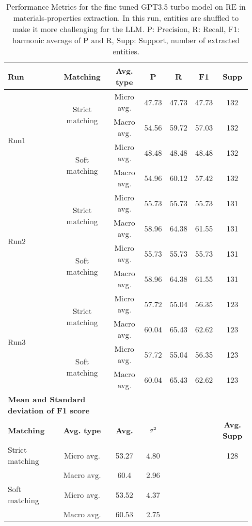 \begin{table}[htbp]
    \small
    \centering
    \caption{Performance Metrics for the fine-tuned GPT3.5-turbo model on RE in materials-properties extraction. In this run, entities are shuffled to make it more challenging for the LLM. P: Precision, R: Recall, F1: harmonic average of P and R, Supp: Support, number of extracted entities.}
    \begin{tabular}{lcccccc}
        \toprule
        \textbf{Run} & \textbf{Matching} & \textbf{Avg. type} & \textbf{P} & \textbf{R} & \textbf{F1} & \textbf{Supp} \\
        \midrule
        \multirow{4}{*}{Run1} & \multirow{2}{*}{Strict matching} & Micro avg. & 47.73 & 47.73 & 47.73 & 132 \\
        & & Macro avg. & 54.56 & 59.72 & 57.03 & 132 \\
        \cmidrule{2-7}
        & \multirow{2}{*}{Soft matching} & Micro avg. & 48.48 & 48.48 & 48.48 & 132 \\
        & & Macro avg. & 54.96 & 60.12 & 57.42 & 132 \\
        \midrule
        \multirow{4}{*}{Run2} & \multirow{2}{*}{Strict matching} & Micro avg. & 55.73 & 55.73 & 55.73 & 131 \\
        & & Macro avg. & 58.96 & 64.38 & 61.55 & 131 \\
        \cmidrule{2-7}
        & \multirow{2}{*}{Soft matching} & Micro avg. & 55.73 & 55.73 & 55.73 & 131 \\
        & & Macro avg. & 58.96 & 64.38 & 61.55 & 131 \\
        \midrule
        \multirow{4}{*}{Run3} & \multirow{2}{*}{Strict matching} & Micro avg. & 57.72 & 55.04 & 56.35 & 123 \\
        & & Macro avg. & 60.04 & 65.43 & 62.62 & 123 \\
        \cmidrule{2-7}
        & \multirow{2}{*}{Soft matching} & Micro avg. & 57.72 & 55.04 & 56.35 & 123 \\
        & & Macro avg. & 60.04 & 65.43 & 62.62 & 123 \\
        \midrule
        \multicolumn{2}{l}{\textbf{Mean and Standard deviation of F1 score}} & & & & & \\
        \midrule
        \textbf{Matching} & \textbf{Avg. type} & \textbf{Avg.} & $\sigma\textsuperscript{2}$ & & & \textbf{Avg. Supp}\\
        Strict matching & Micro avg. & 53.27 & 4.80 & & & 128 \\
        & Macro avg. & 60.4 & 2.96 & & & \\
        Soft matching & Micro avg. & 53.52 & 4.37 & & \\
        & Macro avg. & 60.53 & 2.75 & & \\
        \bottomrule
    \end{tabular}
\end{table}

